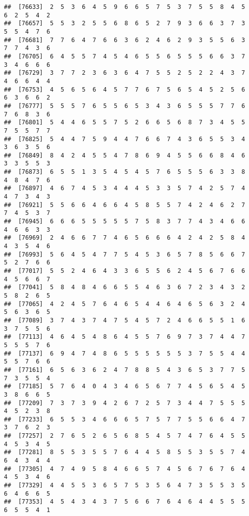 \documentclass[
]{book}
\begin{document}
\begin{verbatim}
##  [76633]  2  5  3  6  4  5  9  6  6  5  7  5  3  7  5  5  8  4  5  6  2  5  4  2
##  [76657]  5  5  3  2  5  5  6  8  6  5  2  7  9  3  6  6  3  7  3  5  5  4  7  6
##  [76681]  7  7  6  4  7  6  6  3  6  2  4  6  2  9  3  5  5  6  3  7  7  4  3  6
##  [76705]  6  4  5  5  7  4  5  4  6  5  5  6  5  5  5  6  6  3  7  3  4  6  6  6
##  [76729]  3  7  7  2  3  6  3  6  4  7  5  5  2  5  2  2  4  3  7  4  6  6  4  4
##  [76753]  4  5  6  5  6  4  5  7  7  6  7  5  6  5  4  5  2  5  6  6  3  6  6  2
##  [76777]  5  5  5  7  6  5  5  6  5  3  4  3  6  5  5  5  7  7  6  7  6  8  3  6
##  [76801]  5  4  4  6  5  5  7  5  2  6  6  5  6  8  7  3  4  5  5  7  5  5  7  7
##  [76825]  5  4  4  7  5  9  4  4  7  6  6  7  4  3  6  5  5  3  4  3  6  3  5  6
##  [76849]  8  4  2  4  5  5  4  7  8  6  9  4  5  5  6  6  8  4  6  3  3  5  5  3
##  [76873]  6  5  5  1  3  5  4  5  4  5  7  6  5  5  5  6  3  3  8  4  8  4  7  6
##  [76897]  4  6  7  4  5  3  4  4  4  5  3  3  5  7  4  2  5  7  4  4  7  3  4  3
##  [76921]  5  5  6  6  4  6  6  4  5  8  5  5  7  4  2  4  6  2  7  7  4  5  3  7
##  [76945]  6  6  6  5  5  5  5  5  7  5  8  3  7  7  4  3  4  6  6  4  6  6  3  3
##  [76969]  2  4  6  6  7  7  4  6  5  6  6  6  4  2  4  2  5  8  4  4  3  5  4  6
##  [76993]  5  6  4  5  4  7  7  5  4  5  3  6  5  7  8  5  6  6  7  5  2  7  6  6
##  [77017]  5  5  2  4  6  4  3  3  6  5  5  6  2  4  5  6  7  6  6  4  5  6  6  7
##  [77041]  5  8  4  8  4  6  6  5  5  4  6  3  6  7  2  3  4  3  2  5  8  2  6  5
##  [77065]  4  2  4  5  7  6  4  6  5  4  4  6  4  6  5  6  3  2  4  5  6  3  6  5
##  [77089]  3  7  4  3  7  4  7  5  4  5  7  2  4  6  6  5  5  1  6  3  7  5  5  6
##  [77113]  4  6  4  5  4  8  6  4  5  5  7  6  9  7  3  7  4  4  7  5  5  5  7  6
##  [77137]  6  9  4  7  4  8  6  5  5  5  5  5  5  3  7  5  5  4  4  5  5  7  6  6
##  [77161]  6  5  6  3  6  2  4  7  8  8  5  4  3  6  5  3  7  7  5  7  3  5  5  4
##  [77185]  5  7  6  4  0  4  3  4  6  5  6  7  7  4  5  6  5  4  5  3  8  6  6  5
##  [77209]  7  3  7  3  9  4  2  6  7  2  5  7  3  4  4  7  5  5  5  4  5  2  3  8
##  [77233]  6  5  5  3  4  6  6  6  5  7  5  7  7  5  5  6  6  4  7  3  7  6  2  3
##  [77257]  2  7  6  5  2  6  5  6  8  5  4  5  7  4  7  6  4  5  5  4  5  3  4  5
##  [77281]  8  5  5  3  5  5  7  6  4  4  5  8  5  5  3  5  5  7  4  6  4  3  4  4
##  [77305]  4  7  4  9  5  8  4  6  6  5  7  4  5  6  7  6  7  6  4  4  5  3  4  6
##  [77329]  4  4  5  5  3  6  5  7  5  3  5  6  4  7  3  5  5  3  5  6  4  6  6  5
##  [77353]  4  5  4  3  4  3  7  5  6  6  7  6  4  6  4  4  5  5  5  6  5  5  4  1

\end{verbatim}
\end{document}
